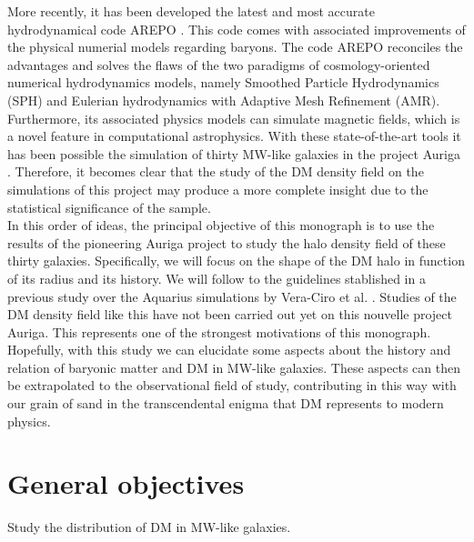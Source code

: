 \documentclass[12pt]{article}
\begin{document}
More recently, it has been developed the latest and most accurate hydrodynamical code AREPO \cite{arepo}. 
This code comes with associated improvements of the physical numerial models regarding baryons. 
The code AREPO reconciles the advantages and solves the flaws of the two paradigms of cosmology-oriented numerical hydrodynamics models, namely Smoothed Particle Hydrodynamics (SPH) and Eulerian hydrodynamics with Adaptive Mesh Refinement (AMR). 
Furthermore, its associated physics models can simulate magnetic fields, which is a novel feature in computational astrophysics. 
With these state-of-the-art tools it has been possible the simulation of thirty MW-like galaxies in the project Auriga \cite{Auriga}.
Therefore, it becomes clear that the study of the DM density field on the simulations of this project may produce a more complete insight due to the statistical significance of the sample.
\\

In this order of ideas, the principal objective of this monograph is to use the results of the pioneering Auriga project \cite{Auriga} to study the halo density field of these thirty galaxies.
Specifically, we will focus on the shape of the DM halo in function of its radius and its history.
We will follow to the guidelines stablished in a previous study over the Aquarius simulations by Vera-Ciro et al. \cite{Vera-Ciro2011}. 
Studies of the DM density field like this have not been carried out yet on this nouvelle project Auriga.
This represents one of the strongest motivations of this monograph.
Hopefully, with this study we can elucidate some aspects about the history and relation of baryonic matter and DM in MW-like galaxies.
These aspects can then be extrapolated to the observational field of study, contributing in this way with our grain of sand in the transcendental enigma that DM represents to modern physics.\\




\section{General objectives}


Study the distribution of DM in MW-like galaxies.
\end{document}
